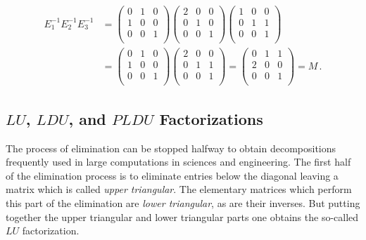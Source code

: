 \begin{example}
\begin{align*}
E_1^{-1}E_2^{-1}E_3^{-1}
&=
\left(\begin{array}{ccc}
0  &1 &0\\
1  &0 &0\\ 
0  &0 &1\\
\end{array}  \right)
 \left(\begin{array}{ccc}
2  &0 &0\\
0  &1 &0\\ 
0  &0 &1\\
\end{array}  \right) 
\left(\begin{array}{ccc}
1  &0 &0\\
0  &1 & 1\\ 
0  &0 &1\\
\end{array}  \right) 
\\[2mm] %
&=
\left(\begin{array}{ccc}
0  &1 &0\\
1  &0 &0\\ 
0  &0 &1\\
\end{array}  \right)
 \left(\begin{array}{ccc}
2  &0 &0\\
0  &1 &1\\ 
0  &0 &1\\
\end{array}  \right) 
= %
\left(\begin{array}{ccc}
 0 &1 &1\\
2  &0 &0\\ 
0  &0 &1\\
\end{array}  \right)  = M \, .
\end{align*}
\end{example}

\subsection{$LU$, $LDU$, and $PLDU$ Factorizations}\label{LUtake1}
The process of elimination can be stopped halfway to obtain decompositions frequently used in large computations in sciences and engineering. 
The first half of the elimination process is to eliminate entries below the diagonal  
leaving a matrix which is called {\itshape upper triangular}. The elementary matrices which perform this part of the elimination are {\itshape lower triangular}, as are their inverses. But putting together the upper triangular and lower triangular parts one obtains the so-called $LU$ factorization.


